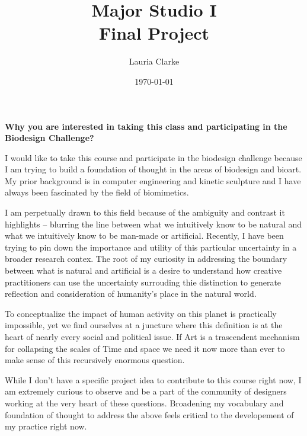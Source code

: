 \documentclass[11pt]{report}
\title{Major Studio I \\ Final Project}
\date{\today}
\author{Lauria Clarke}
\begin{document}
\maketitle
                                                                                                                                                                                                                                                                                                                                                                                                                                                                                 
\textbf{Why you are interested in taking this class and participating in the Biodesign Challenge?}
                                                               
I would like to take this course and participate in the biodesign challenge because I am trying to build a foundation of thought in the areas of biodesign and bioart. My prior background is in computer engineering and kinetic sculpture and I have always been fascinated by the field of biomimetics. 

I am perpetually drawn to this field because of the ambiguity and contrast it highlights -- blurring the line between what we intuitively know to be natural and what we intuitively know to be man-made or artificial. Recently, I have been trying to pin down the importance and utility of this particular uncertainty in a broader research contex. The root of my curiosity in addressing the boundary between what is natural and artificial is a desire to understand how creative practitioners can use the uncertainty surrouding thie distinction to generate reflection and consideration of humanity's place in the natural world. 

To conceptualize the impact of human activity on this planet is practically impossible, yet we find ourselves at a juncture where this definition is at the heart of nearly every social and political issue. If Art is a trascendent mechanism for collapsing the scales of Time and space we need it now more than ever to make sense of this recursively enormous question.  

While I don't have a specific project idea to contribute to this course right now, I am extremely curious to observe and be a part of the community of designers working at the very heart of these questions. Broadening my vocabulary and foundation of thought to address the above feels critical to the developement of my practice right now. 
\end{document}
